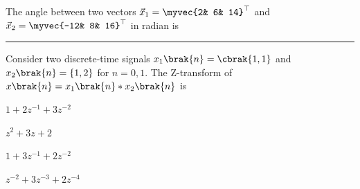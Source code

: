 \item The angle between two vectors $\vec{x}_1 = \myvec{2& 6& 14}^{\top}$ and $\vec{x}_2 = \myvec{-12& 8& 16}^{\top}$ in radian is \rule{1cm}{0.01pt} 
\hfill{}
\item Consider two discrete-time signals   
$x_1\brak{n} = \cbrak{1, 1}$ and $x_2 \brak{n} = \{1, 2\}$ for $n = 0, 1$. 
The Z-transform of $x \brak{n} = x_1 \brak{n} * x_2 \brak{n}$ is \hfill{}
\begin{enumerate}
\begin{multicols}{4}
    \item $1 + 2z^{-1} + 3z^{-2}$
    \item $z^2 + 3z + 2$
    \item $1 + 3z^{-1} + 2z^{-2}$
    \item $z^{-2} + 3z^{-3} + 2z^{-4}$
\end{multicols}
\end{enumerate}

